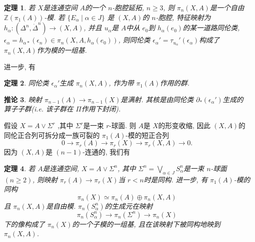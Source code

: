 \documentclass{ctexart}
\theoremstyle{plain}
\newtheorem{theorem}{定理}[section]
\newtheorem{corollary}[theorem]{推论}
\theoremstyle{definition}
\begin{document}
        \begin{theorem}
            若 $X$是连通空间 $A$的一个 $n$-胞腔延拓, $n\ge 3$, 则 $\pi_{n}(X,A)$是一个自由 $\mathbb{Z}(\pi_1(A))$-模. 若 $\{E_{\alpha}\mid \alpha \in J\}$ 是 $(X,A)$的 $n$-胞腔, 特征映射为 $h_{\alpha}:(\Delta^{n},\dot{\Delta}^{n})\to (X,A)$, 并且 $u_{\alpha}$是 $A$中从 $e_0$到 $h_{\alpha}(e_0)$的某一道路同伦类, $\epsilon_{\alpha}=h_{\alpha *}(\epsilon_{n})\in \pi_{n}(X,A,h_{\alpha}(e_0))$, 则同伦类 $\epsilon_{\alpha}'=\tau_{u_{\alpha}}'(\epsilon_{\alpha})$构成了 $\pi_{n}(X,A)$作为模的一组基.
        \end{theorem}

        进一步, 有 
        \begin{theorem}
            同伦类 $\epsilon_{\alpha}'$生成 $\pi_{n}(X,A)$, 作为带 $\pi_{1}(A)$作用的群.
        \end{theorem}

        \begin{corollary}
            \label{cor:attaching cells}
            映射 $\pi_{n-1}(A)\to \pi_{n-1}(X)$是满射. 其核是由同伦类 $\partial_* (\epsilon_{\alpha}')$生成的算子子群(i.e. 该子群在 $\Pi$作用下封闭).
        \end{corollary}

%        
%

        假设 $X= A \vee \Sigma^{r}$ ,其中 $\Sigma^{r}$是一束 $r$-球面. 则 $A$是 $X$的形变收缩, 因此 $(X,A)$的同伦正合列可拆分成一族可裂的 $\pi_1(A)$-模的短正合列 
        \begin{equation*}
          0\to \pi_{r}(A)\to \pi_{r}(X)\to \pi_{r}(X,A)\to 0.
        \end{equation*}
        因为 $(X,A)$是 $(n-1)$-连通的, 我们有 
        
        \begin{theorem}
            \label{thm:a freely attached base, used below}
            若 $A$是连通空间, $X=A\vee \Sigma^{n}$, 其中 $\Sigma^{n}=\bigvee_{\alpha \in J} S^{n}_{\alpha}$是一束 $n$-球面 $(n\ge 2)$, 则映射 $\pi_{r}(A)\to \pi_{r}(X)$当 $r<n$时是同构. 进一步, 有 $\pi_{1}(A)$-模的同构 
            \begin{equation*}
              \pi_{n}(X)\simeq \pi_{n}(A)\oplus \pi_{n}(X,A)
            \end{equation*}
            且 $\pi_{n}(X,A)$是自由模. $\pi_{n}(S^{n}_{\alpha})$的生成元在映射 
            \begin{equation*}
              \pi_{n}(S^{n}_{\alpha})\to \pi_{n}(\Sigma^{n})\to \pi_{n}(X)
            \end{equation*}
            下的像构成了 $\pi_{n}(X)$的一个子模的一组基, 且在该映射下被同构地映到 $\pi_{n}(X,A)$.
        \end{theorem}  
\end{document}
